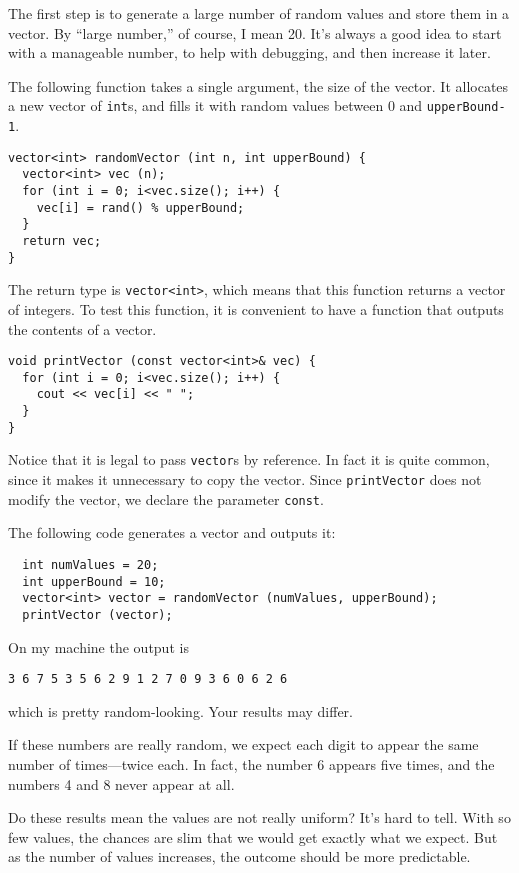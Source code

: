 The first step is to generate a large number of random values
and store them in a vector.  By ``large number,'' of course,
I mean 20.  It's always a good idea to start with a manageable
number, to help with debugging, and then increase it later.

The following function takes a single argument, the size of
the vector.  It allocates a new vector of {\tt int}s, 
and fills it with random values between 0 and {\tt upperBound-1}.

\begin{lstlisting}
vector<int> randomVector (int n, int upperBound) {
  vector<int> vec (n);
  for (int i = 0; i<vec.size(); i++) {
    vec[i] = rand() % upperBound;
  }
  return vec;
}
\end{lstlisting}
%
The return type is {\tt vector<int>}, which means that
this function returns a vector of integers.
To test this function, it is convenient to have a function that
outputs the contents of a vector.

\begin{lstlisting}
void printVector (const vector<int>& vec) {
  for (int i = 0; i<vec.size(); i++) {
    cout << vec[i] << " ";
  }
}
\end{lstlisting}
%
Notice that it is legal to pass {\tt vector}s by reference.
In fact it is quite common, since it makes it unnecessary to
copy the vector.  Since {\tt printVector} does not modify the
vector, we declare the parameter {\tt const}.

The following code generates a vector and outputs it:

\begin{lstlisting}
  int numValues = 20;
  int upperBound = 10;
  vector<int> vector = randomVector (numValues, upperBound);
  printVector (vector);
\end{lstlisting}
%
On my machine the output is

\begin{verbatim}
3 6 7 5 3 5 6 2 9 1 2 7 0 9 3 6 0 6 2 6 
\end{verbatim}
%
which is pretty random-looking.  Your results may differ.

If these numbers are really random,
we expect each digit to appear the same number of times---twice
each.  In fact, the number 6 appears five times, and the numbers 4
and 8 never appear at all.

Do these results mean the values are not really uniform?  It's
hard to tell.  With so few values, the chances are slim
that we would get exactly what we expect.  But as the number
of values increases, the outcome should be more predictable.

